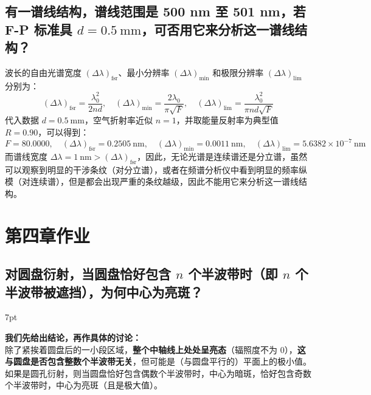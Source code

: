 \documentclass[UTF8]{report}
\theoremstyle{MyLineTheoremStyle} %
\theoremstyle{MyBlockTheoremStyle} %
\theoremstyle{MySubsubsectionStyle} %
\newenvironment{graybox}{%
        \def\FrameCommand{%
        \hspace{1pt}%
        {\color{gray}\small \vrule width 2pt}%
        {\color{graybox_color}\vrule width 4pt}%
        \colorbox{graybox_color}%
        }%
        \MakeFramed{\advance\hsize-\width\FrameRestore}%
        \noindent\hspace{-4.55pt}%
        \begin{adjustwidth}{}{7pt}%
        \vspace{2pt}\vspace{2pt}%
        }
        {%
        \vspace{2pt}\end{adjustwidth}\endMakeFramed%
        }
\begin{document}
\section{有一谱线结构，谱线范围是 500 nm 至 501 nm，若 F-P 标准具 $d = 0.5 \ \mathrm{mm}$，可否用它来分析这一谱线结构？}

波长的自由光谱宽度 $\left(\Delta\lambda\right)_{\text{fsr}}$、最小分辨率 $\left(\Delta\lambda\right)_{\min}$ 和极限分辨率 $\left(\Delta\lambda\right)_{\lim}$ 分别为：
\begin{equation}
    \left(\Delta\lambda\right)_{\text{fsr}} = \frac{\lambda_0^2}{2 n d}
    ,\quad 
    \left(\Delta\lambda\right)_{\min} = \frac{2\lambda_0}{\pi \sqrt{F}}
    ,\quad 
    \left(\Delta\lambda\right)_{\lim} = \frac{\lambda_0^2}{\pi n d \sqrt{F}}
\end{equation}
代入数据 $d = 0.5 \ \mathrm{mm}$，空气折射率近似 $n = 1$，并取能量反射率为典型值 $R = 0.90$，可以得到：
\begin{equation}
F = 80.0000 ,\quad 
\left(\Delta\lambda\right)_{\text{fsr}} = 0.2505 \ \mathrm{nm}
,\quad
\left(\Delta\lambda\right)_{\min} = 0.0011 \ \mathrm{nm}
,\quad 
\left(\Delta\lambda\right)_{\lim} = 5.6382 \times 10^{-7} \ \mathrm{nm}
\end{equation}
而谱线宽度 $\Delta \lambda = 1 \ \mathrm{nm} > \left(\Delta\lambda\right)_{\text{fsr}}$，因此，无论光谱是连续谱还是分立谱，虽然可以观察到明显的干涉条纹（对分立谱），或者在频谱分析仪中看到明显的频率纵模（对连续谱），但是都会出现严重的条纹越级，因此不能用它来分析这一谱线结构。

\chapter{第四章作业}\thispagestyle{fancy}

\section{对圆盘衍射，当圆盘恰好包含 $n$ 个半波带时（即 $n$ 个半波带被遮挡），为何中心为亮斑？}
\begin{graybox}
\textbf{我们先给出结论，再作具体的讨论：}\\
除了紧挨着圆盘后的一小段区域，{\bfseries 整个中轴线上处处呈亮态}（辐照度不为 0），{\bfseries 这与圆盘是否包含整数个半波带无关}，但可能是（与圆盘平行的）平面上的极小值。如果是圆孔衍射，则当圆盘恰好包含偶数个半波带时，中心为暗斑，恰好包含奇数个半波带时，中心为亮斑（且是极大值）。
\end{graybox}
\end{document}
